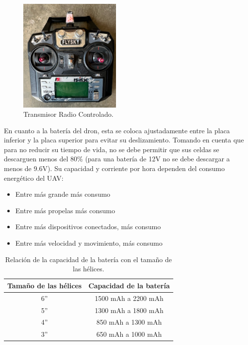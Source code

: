 \begin{figure}[H]
    \centering
    \includegraphics[width=0.45\textwidth]{imagenes/control.jpeg}
    \caption{Transmisor Radio Controlado.}
    \label{fig:control}
\end{figure}

\noindent En cuanto a la batería del dron, esta se coloca ajustadamente entre la placa inferior y la placa superior para evitar su deslizamiento. Tomando en cuenta que para no reducir su tiempo de vida, no se debe permitir que sus celdas se descarguen menos del 80\% (para una batería de 12V no se debe descargar a menos de 9.6V). Su capacidad y corriente por hora dependen del consumo energético del UAV:
\begin{itemize}
    \item Entre más grande más consumo
    \item Entre más propelas más consumo
    \item Entre más dispositivos conectados, más consumo
    \item Entre más velocidad y movimiento, más consumo
\end{itemize}

\begin{table}[H]
    \centering
    \caption{Relación de la capacidad de la batería con el tamaño de las hélices.}
    \begin{tabular}{|c|c|}
        \hline
        \cellcolor[HTML]{C0C0C0}Tamaño de las hélices & \cellcolor[HTML]{C0C0C0}Capacidad de la batería \\
        \hline
        6” & 1500 mAh a 2200 mAh \\
        \hline
        5” & 1300 mAh a 1800 mAh \\
        \hline
        4” & 850 mAh a 1300 mAh \\
        \hline
        3” & 650 mAh a 1000 mAh \\
        \hline
    \end{tabular}
    \label{tab:battery_helices}
\end{table}

